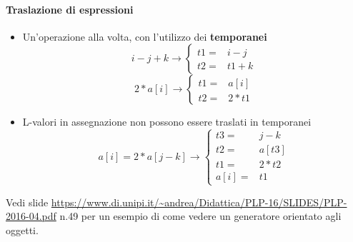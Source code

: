 \paragraph{Traslazione di espressioni}
\begin{itemize}
\item Un'operazione alla volta, con l'utilizzo dei \textbf{temporanei}
$$
i - j + k \to \left\{
\begin{array}{lr}
  t1 = & i - j \\
  t2 = & t1 + k
\end{array}
\right.
$$
$$
2 * a[i] \to \left\{
\begin{array}{lr}
  t1 = & a[i] \\
  t2 = & 2 * t1
\end{array}
\right.
$$
\item L-valori in assegnazione non possono essere traslati in temporanei
$$
a[i] = 2 * a[j-k] \to \left\{
\begin{array}{lr}
  t3   = & j - k \\
  t2   = & a[t3] \\
  t1   = & 2 * t2 \\
  a[i] = & t1
\end{array}
\right.
$$
\end{itemize}

Vedi slide
\url{https://www.di.unipi.it/~andrea/Didattica/PLP-16/SLIDES/PLP-2016-04.pdf}
n.49 per un esempio di come vedere un generatore orientato agli oggetti.
